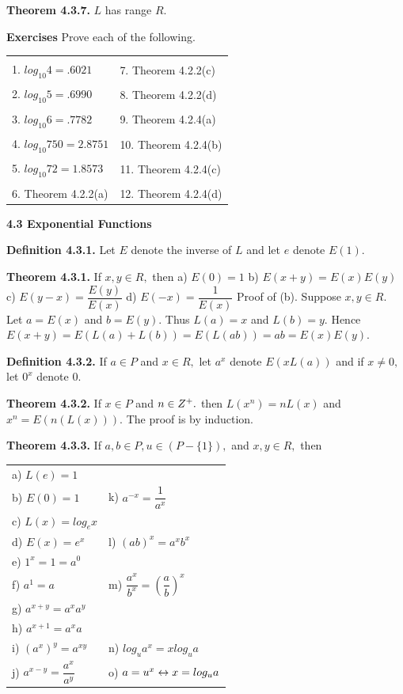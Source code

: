 \textbf{Theorem 4.3.7.} $L$ has range $R.$\nl

\textbf{Exercises}\nl
Prove each of the following.\nl

\begin{tabular}{l l}
&\\
1. $log_{10}4 =.6021$ &7. Theorem 4.2.2(c) \\
&\\
2. $log_{10}5 =.6990$  &8. Theorem 4.2.2(d) \\
&\\
3. $log_{10}6 =.7782$ &9. Theorem 4.2.4(a)\\
&\\
4. $log_{10}750 = 2.8751$ &10. Theorem 4.2.4(b)\\
&\\
5. $log_{10}72 = 1.8573$ &11. Theorem 4.2.4(c)\\
&\\
6. Theorem 4.2.2(a)& 12. Theorem 4.2.4(d)\\
\end{tabular}

\newpage
\textbf{4.3 Exponential Functions}\nl

\textbf{Definition 4.3.1.} Let $E$ denote the inverse of $L$ and let $e$ denote $E(1).$\nl

\textbf{Theorem 4.3.1.} If $x,y\in R,$ then\nl
a) $E(0) = 1$\nl
b) $E(x + y) = E(x)E(y)$\nl
c) $E(y - x) = \dfrac{E(y)}{E(x)}$\nl
d) $E(-x) = \dfrac{1}{E(x)}$\nl
Proof of (b). Suppose $x,y\in R.$ Let $a = E(x)$ and $b = E(y).$ Thus $L(a) = x$ and $L(b) = y.$ Hence $E(x + y)=E(L(a) + L(b)) = E(L(ab)) = ab = E(x)E(y).$\nl

\textbf{Definition 4.3.2.} If $a\in P$ and $x\in R,$ let $a^{x}$ denote $E(xL(a))$  and if $x\neq 0,$ let $0^{x}$ denote $0$.\nl

\textbf{Theorem 4.3.2.} If $x\in P$ and $n\in Z^{+}.$ then $L(x^{n}) =n L(x)$ and $x^{n} = E\left(n(L(x))\right).$   The proof is by induction. \nl

\textbf{Theorem 4.3.3.} If $a,b\in P, u\in (P-\{1\}),$ and $x,y\in R,$ then\nl

\begin{tabular}{l l}
a) $L(e)=1$&\\
b) $E(0) = 1$&     k) $a^{-x} = \dfrac{1}{a^{x}}$ \\
c) $L(x) = log_{e}x$&\\
d) $E(x) =e^{x}$  &  l) $(ab)^{x} = a^{x}b^{x}$\\
e) $1^{x} = 1 = a^{0}$&\\
f) $a^{1} = a$&       m)  $ \dfrac{a^{x}}{b^{x}} = \left(\dfrac{a}{b}\right)^{x}$\\
g) $a^{x +y} = a^{x}a^{y}$&\\
h) $a^{x + 1} = a^{x}a$&\\
i) $(a^{x})^{y} = a^{xy}$&    n) $log_{u}a^{x} = xlog_{u}a$\\
j) $a^{x - y} = \dfrac{a^x}{a^y}$&    o) $a = u^{x} \leftrightarrow x = log_{u}a$\\
\end{tabular}\\

